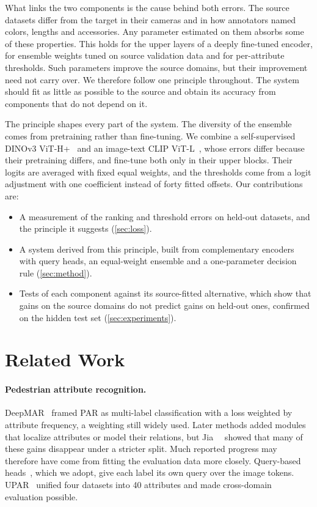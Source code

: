 \documentclass[10pt,twocolumn,letterpaper]{article}
\begin{document}
What links the two components is the cause behind both errors. The source datasets differ from the target in their cameras and in how annotators named colors, lengths and accessories. Any parameter estimated on them absorbs some of these properties. This holds for the upper layers of a deeply fine-tuned encoder, for ensemble weights tuned on source validation data and for per-attribute thresholds. Such parameters improve the source domains, but their improvement need not carry over. We therefore follow one principle throughout. The system should fit as little as possible to the source and obtain its accuracy from components that do not depend on it.

The principle shapes every part of the system. The diversity of the ensemble comes from pretraining rather than fine-tuning. We combine a self-supervised DINOv3 ViT-H+~\cite{dinov3} and an image-text CLIP ViT-L~\cite{clip}, whose errors differ because their pretraining differs, and fine-tune both only in their upper blocks. Their logits are averaged with fixed equal weights, and the thresholds come from a logit adjustment with one coefficient instead of forty fitted offsets. Our contributions are:
\begin{itemize}
\item A measurement of the ranking and threshold errors on held-out datasets, and the principle it suggests (\cref{sec:loss}).
\item A system derived from this principle, built from complementary encoders with query heads, an equal-weight ensemble and a one-parameter decision rule (\cref{sec:method}).
\item Tests of each component against its source-fitted alternative, which show that gains on the source domains do not predict gains on held-out ones, confirmed on the hidden test set (\cref{sec:experiments}).
\end{itemize}

\section{Related Work}
\label{sec:related}

\paragraph{Pedestrian attribute recognition.} DeepMAR~\cite{deepmar} framed PAR as multi-label classification with a loss weighted by attribute frequency, a weighting still widely used. Later methods added modules that localize attributes or model their relations, but Jia~\etal~\cite{rethinkpar} showed that many of these gains disappear under a stricter split. Much reported progress may therefore have come from fitting the evaluation data more closely. Query-based heads~\cite{q2l,mldecoder}, which we adopt, give each label its own query over the image tokens. UPAR~\cite{upar} unified four datasets into 40 attributes and made cross-domain evaluation possible.
\end{document}
